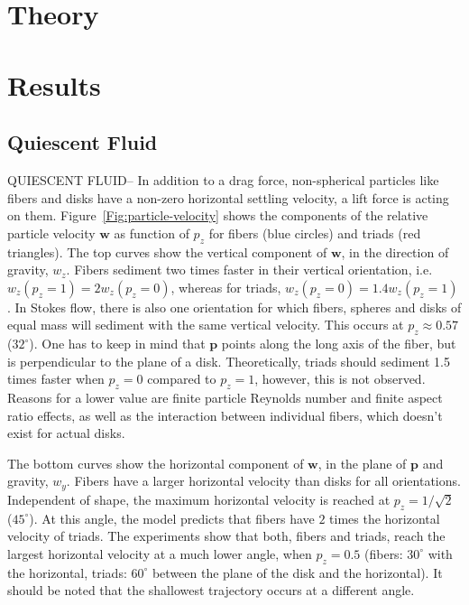 \documentclass[]{jfm}
\begin{document}
\section{Theory}

\section{Results}
\subsection{Quiescent Fluid}

QUIESCENT FLUID-- In addition to a drag force, non-spherical particles like fibers and disks have a non-zero horizontal settling velocity, a lift force is acting on them.  Figure~\ref{Fig:particle-velocity} shows the components of the relative particle velocity $\mathbf{w}$ as function of $p_z$ for fibers (blue circles) and triads (red triangles).  The top curves show the vertical component of $\mathbf{w}$, in the direction of gravity, $w_z$.  Fibers sediment two times faster in their vertical orientation, i.e. $w_z(p_z{=}1)=2w_z(p_z{=}0)$, whereas for triads, $w_z(p_z{=}0)=1.4w_z(p_z{=}1)$.  In Stokes flow, there is also one orientation for which fibers, spheres and disks of equal mass will sediment with the same vertical velocity.  This occurs at $p_z\approx 0.57$ ($32^{\circ}$). One has to keep in mind that $\mathbf{p}$ points along the long axis of the fiber, but is perpendicular to the plane of a disk.  Theoretically, triads should sediment 1.5 times faster when $p_z{=}0$ compared to $p_z{=}1$, however, this is not observed.  Reasons for a lower value are finite particle Reynolds number and finite aspect ratio effects, as well as the interaction between individual fibers, which doesn't exist for actual disks.  

The bottom curves show the horizontal component of $\mathbf{w}$, in the plane of $\mathbf{p}$ and gravity, $w_y$. Fibers have a larger horizontal velocity than disks for all orientations. Independent of shape, the maximum horizontal velocity is reached at $p_z = 1/\sqrt{2}$ ($45^{\circ}$). At this angle, the model predicts that fibers have $2$ times the horizontal velocity of triads.  The experiments show that both, fibers and triads, reach the largest horizontal velocity at a much lower angle, when $p_z=0.5$ (fibers: $30^{\circ}$ with the horizontal, triads: $60^{\circ}$ between the plane of the disk and the horizontal).  It should be noted that the shallowest trajectory occurs at a different angle.  
\end{document}
